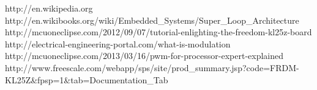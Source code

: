 \renewcommand*{\refname}{Referințe bibliografice}

\begin{thebibliography}{00}
\bibitem{} http://en.wikipedia.org
\bibitem{} http://en.wikibooks.org/wiki/Embedded\_Systems/Super\_Loop\_Architecture
\bibitem{} http://mcuoneclipse.com/2012/09/07/tutorial-enlighting-the-freedom-kl25z-board
\bibitem{} http://electrical-engineering-portal.com/what-is-modulation
\bibitem{} http://mcuoneclipse.com/2013/03/16/pwm-for-processor-expert-explained
\bibitem{} http://www.freescale.com/webapp/sps/site/prod\_summary.jsp?code=FRDM-KL25Z\&fpsp=1\&tab=Documentation\_Tab  
\end{thebibliography}

